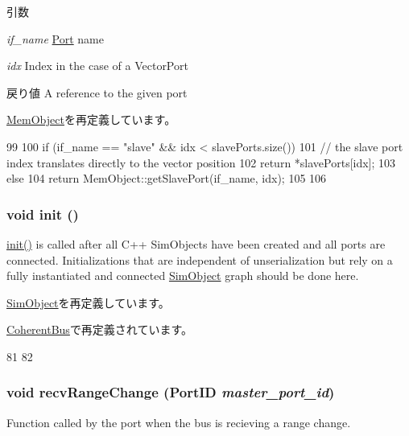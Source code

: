 \begin{DoxyParams}{引数}
\item[{\em if\_\-name}]\hyperlink{classPort}{Port} name \item[{\em idx}]Index in the case of a VectorPort\end{DoxyParams}
\begin{DoxyReturn}{戻り値}
A reference to the given port 
\end{DoxyReturn}


\hyperlink{classMemObject_ac918a145092d7514ebc6dbd952dceafb}{MemObject}を再定義しています。


\begin{DoxyCode}
99 {
100     if (if_name == "slave" && idx < slavePorts.size()) {
101         // the slave port index translates directly to the vector position
102         return *slavePorts[idx];
103     } else {
104         return MemObject::getSlavePort(if_name, idx);
105     }
106 }
\end{DoxyCode}
\hypertarget{classBaseBus_a02fd73d861ef2e4aabb38c0c9ff82947}{
\subsubsection[{init}]{\setlength{\rightskip}{0pt plus 5cm}void init ()}}
\label{classBaseBus_a02fd73d861ef2e4aabb38c0c9ff82947}
\hyperlink{classBaseBus_a02fd73d861ef2e4aabb38c0c9ff82947}{init()} is called after all C++ SimObjects have been created and all ports are connected. Initializations that are independent of unserialization but rely on a fully instantiated and connected \hyperlink{classSimObject}{SimObject} graph should be done here. 

\hyperlink{classSimObject_a02fd73d861ef2e4aabb38c0c9ff82947}{SimObject}を再定義しています。

\hyperlink{classCoherentBus_a02fd73d861ef2e4aabb38c0c9ff82947}{CoherentBus}で再定義されています。


\begin{DoxyCode}
81 {
82 }
\end{DoxyCode}
\hypertarget{classBaseBus_a85a99f51d8fef63034675b40df7eea7e}{
\subsubsection[{recvRangeChange}]{\setlength{\rightskip}{0pt plus 5cm}void recvRangeChange ({\bf PortID} {\em master\_\-port\_\-id})}}
\label{classBaseBus_a85a99f51d8fef63034675b40df7eea7e}
Function called by the port when the bus is recieving a range change.


